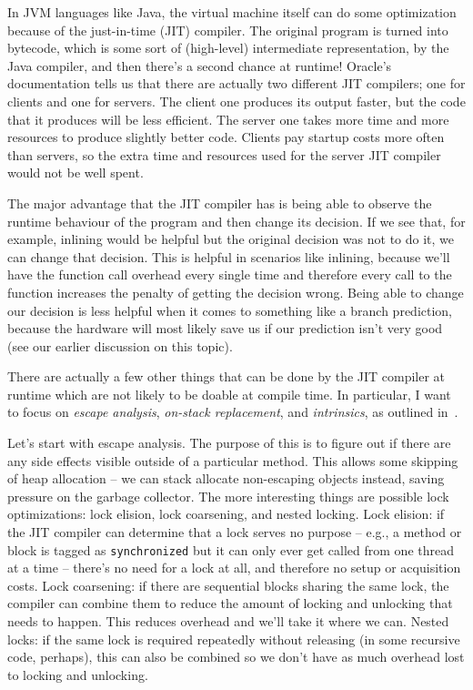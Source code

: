 In JVM languages like Java, the virtual machine itself can do some optimization because of the just-in-time (JIT) compiler. The original program is turned into bytecode, which is some sort of (high-level) intermediate representation, by the Java compiler, and then there's a second chance at runtime! Oracle's documentation tells us that there are actually two different JIT compilers; one for clients and one for servers. The client one produces its output faster, but the code that it produces will be less efficient. The server one takes more time and more resources to produce slightly better code. Clients pay startup costs more often than servers, so the extra time and resources used for the server JIT compiler would not be well spent.

The major advantage that the JIT compiler has is being able to observe the runtime behaviour of the program and then change its decision. If we see that, for example, inlining would be helpful but the original decision was not to do it, we can change that decision. This is helpful in scenarios like inlining, because we'll have the function call overhead every single time and therefore every call to the function increases the penalty of getting the decision wrong. Being able to change our decision is less helpful when it comes to something like a branch prediction, because the hardware will most likely save us if our prediction isn't very good (see our earlier discussion on this topic).

There are actually a few other things that can be done by the JIT compiler at runtime which are not likely to be doable at compile time. In particular, I want to focus on \textit{escape analysis}, \textit{on-stack replacement}, and \textit{intrinsics}, as outlined in~\cite{escape}.

Let's start with escape analysis. The purpose of this is to figure out if there are any side effects visible outside of a particular method. This allows some skipping of heap allocation -- we can stack allocate non-escaping objects instead, saving pressure on the garbage collector. The more interesting things are possible lock optimizations: lock elision, lock coarsening, and nested locking. Lock elision: if the JIT compiler can determine that a lock serves no purpose -- e.g., a method or block is tagged as \texttt{synchronized} but it can only ever get called from one thread at a time -- there's no need for a lock at all, and therefore no setup or acquisition costs. Lock coarsening: if there are sequential blocks sharing the same lock, the compiler can combine them to reduce the amount of locking and unlocking that needs to happen. This reduces overhead and we'll take it where we can. Nested locks: if the same lock is required repeatedly without releasing (in some recursive code, perhaps), this can also be combined so we don't have as much overhead lost to locking and unlocking.

